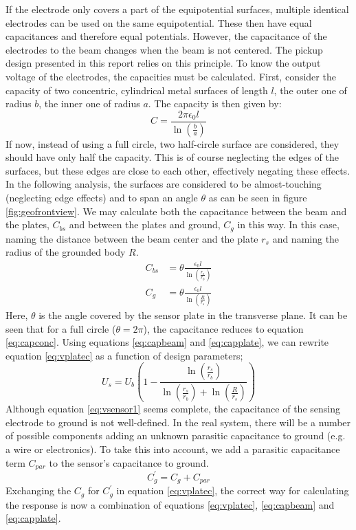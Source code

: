 If the electrode only covers a part of the equipotential surfaces, multiple identical electrodes can be used on the same equipotential. These then have equal capacitances and therefore equal potentials.
However, the capacitance of the electrodes to the beam changes when the beam is not centered. The pickup design presented in this report relies on this principle.
To know the output voltage of the electrodes, the capacities must be calculated.
First, consider the capacity of two concentric, cylindrical metal surfaces of length $l$, the outer one of radius $b$, the inner one of radius $a$. The capacity is then given by\cite{GriffithsEM}:
\begin{equation}
C = \frac{2\pi\epsilon_0l}{\ln \left(\frac{b}{a} \right)}
\label{eq:capconc}
\end{equation}
If now, instead of using a full circle, two half-circle surface are considered, they should have only half the capacity. This is of course neglecting the edges of the surfaces, but these edges are close to each other, effectively negating these effects. In the following analysis, the surfaces are considered to be almost-touching (neglecting edge effects) and to span an angle $\theta$ as can be seen in figure \ref{fig:geofrontview}.
We may calculate both the capacitance between the beam and the plates, $C_{bs}$ and between the plates and ground, $C_g$ in this way. In this case, naming the distance between the beam center and the plate $r_s$ and naming the radius of the grounded body $R$.
\begin{align}
C_{bs} &= \theta \frac{\epsilon_0l}{\ln\left(\frac{r_s}{r_b}\right)} \label{eq:capbeam}\\
C_g &= \theta \frac{\epsilon_0l}{\ln\left(\frac{R}{r_s}\right)}
\label{eq:capplate}
\end{align}
Here, $\theta$ is the angle covered by the sensor plate in the transverse plane. It can be seen that for a full circle ($\theta=2\pi$), the capacitance reduces to equation \ref{eq:capconc}.
Using equations \ref{eq:capbeam} and \ref{eq:capplate}, we can rewrite equation \ref{eq:vplatec} as a function of design parameters;
\begin{equation}
U_s = U_b \left(1-\frac{\ln\left(\frac{r_s}{r_b}\right)}{\ln\left(\frac{r_s}{r_b}\right)+\ln\left(\frac{R}{r_s}\right)} \right)
\label{eq:vsensor1}
\end{equation}
Although equation \ref{eq:vsensor1} seems complete, the capacitance of the sensing electrode to ground is not well-defined.  In the real system, there will be a number of possible components adding an unknown parasitic capacitance to ground (e.g. a wire or electronics). To take this into account, we add a parasitic capacitance term $C_{par}$ to the sensor's capacitance to ground.
\begin{equation*}
C_g^\prime = C_g + C_{par} 
\end{equation*}
Exchanging the $C_g$ for $C_g^\prime$ in equation \ref{eq:vplatec}, the correct way for calculating the response is now a combination of equations \ref{eq:vplatec}, \ref{eq:capbeam} and \ref{eq:capplate}.

